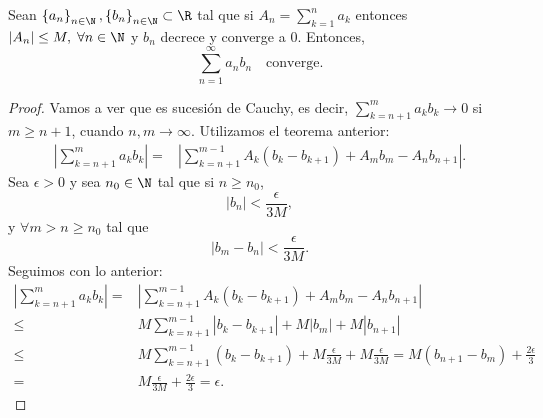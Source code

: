 \begin{ftheorem}
	\normalfont Sean $\displaystyle \left\{ a_{n}\right\} _{n\in\N}, \left\{ b_{n}\right\} _{n\in\N} \subset \R $ tal que si $\displaystyle A_{n} = \sum^{n}_{k=1}a_{k} $ entonces $\displaystyle \left|A_{n}\right| \leq M, \; \forall n \in \N $ y $\displaystyle b_{n} $ decrece y converge a 0. Entonces, 
	\[\sum^{\infty}_{n = 1}a_{n}b_{n} \quad \text{converge.} \]
\end{ftheorem}

\begin{proof}
Vamos a ver que es sucesión de Cauchy, es decir, $\displaystyle \sum^{m}_{k=n+1}a_{k}b_{k} \to 0 $ si $\displaystyle m \geq n +1 $, cuando $\displaystyle n, m \to \infty $. Utilizamos el teorema anterior:
\[
\begin{split}
	\left|\sum^{m}_{k=n+1}a_{k}b_{k}\right| = & \left|\sum^{m - 1}_{k=n+1}A_{k}\left(b_{k}-b_{k+1}\right)+A_{m}b_{m} - A_{n}b_{n+1}\right| .
\end{split}
\]
Sea $\displaystyle \epsilon > 0 $ y sea $\displaystyle n_{0}\in\N $ tal que si $\displaystyle n \geq n_{0} $, 
\[ \left|b_{n}\right| < \frac{\epsilon }{3M} ,\]
y $\displaystyle \forall m > n \geq n_{0} $ tal que 
\[ \left|b_{m}-b_{n}\right| < \frac{\epsilon }{3M} .\]
Seguimos con lo anterior:
\[
\begin{split}
	\left|\sum^{m}_{k=n+1}a_{k}b_{k}\right| = & \left|\sum^{m - 1}_{k=n+1}A_{k}\left(b_{k}-b_{k+1}\right)+A_{m}b_{m} - A_{n}b_{n+1}\right| \\
	\leq & M \sum^{m -1}_{k = n+1} \left|b_{k}-b_{k+1}\right| + M \left|b_{m}\right| + M \left|b_{n + 1}\right| \\
	\leq & M\sum^{m - 1}_{k = n+1}\left(b_{k}-b_{k+1}\right) + M\frac{\epsilon }{3M} + M\frac{\epsilon }{3M} = M \left(b_{n+1}-b_{m}\right) + \frac{2\epsilon }{3} \\
	    = & M\frac{\epsilon }{3M} + \frac{2\epsilon }{3} = \epsilon.
\end{split}
\]
\end{proof}


